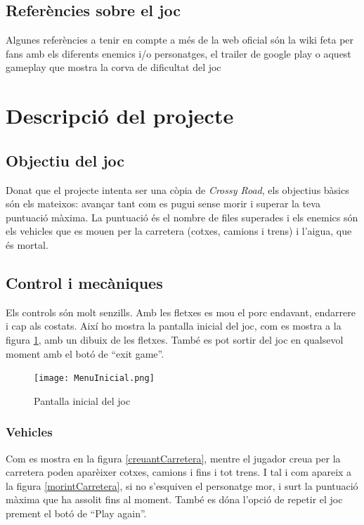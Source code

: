 \documentclass{article}
\begin{document}
\subsection{Referències sobre el joc}

Algunes referències a tenir en compte a més de la web oficial \cite{webCrossy} són la wiki feta per
fans \cite{crossyWiki} amb els diferents enemics i/o personatges, el trailer
de google play \cite{trailerCrossy} o aquest gameplay que mostra la corva de dificultat
del joc \cite{gameplayCrossy}

\section{Descripció del projecte}

\subsection{Objectiu del joc}
Donat que el projecte intenta ser una còpia de \textit{Crossy Road}, els
objectius bàsics són els mateixos: avançar tant com es pugui sense morir i
superar la teva puntuació màxima. La puntuació és el nombre de files superades i
els enemics són els vehicles que es mouen per la carretera (cotxes, camions i trens)
i l'aigua, que és mortal. \newline

\subsection{Control i mecàniques}
Els controls són molt senzills. Amb les fletxes es mou el porc endavant, endarrere
i cap als costats. Així ho mostra la pantalla inicial del joc, com es mostra a la figura
\ref{menuInicial}, amb un dibuix de les fletxes. També es pot sortir del joc en
qualsevol moment amb el botó de ``exit game''.

\begin{figure}[h!]
	\texttt{[image: MenuInicial.png]}
	\caption{Pantalla inicial del joc}
	\label{menuInicial}
\end{figure}

\subsubsection{Vehicles}

Com es mostra en la figura \ref{creuantCarretera}, mentre el jugador
creua per la carretera poden aparèixer cotxes, camions i fins i tot trens.
I tal i com apareix a la figura \ref{morintCarretera}, si no s'esquiven el personatge
mor, i surt la puntuació màxima que ha assolit fins al moment. També es dóna
l'opció de repetir el joc prement el botó de ``Play again''.
\end{document}
